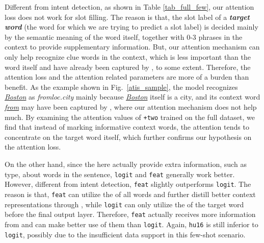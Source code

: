 Different from intent detection, as shown in Table \ref{tab_full_few}, our attention loss does not work for slot filling.
The reason is that, the slot label of a \textbf{\emph{target word}} (the word for which we are trying to predict a slot label) is decided mainly by the semantic meaning of the word itself, together with 0-3 phrases in the context to provide supplementary information.
But, our attention mechanism can only help recognize clue words in the context, which is less important than the word itself and have already been captured by \BLSTM, to some extent. %
Therefore, the attention loss and the attention related parameters are more of a burden than benefit.
As the example shown in Fig.~\ref{atis_sample},
the model recognizes \textsl{\underline{Boston}} as \emph{fromloc.city} mainly because \textsl{\underline{Boston}} itself is a city, 
and its  context word \textsl{\underline{from}} may have been %
captured by \BLSTM, where our attention mechanism does not help much.
By examining the attention values of \texttt{+two} trained on the full dataset,
we find that instead of marking informative context words, the attention tends to concentrate on the target word itself, which
further confirms our hypothesis on the attention loss.

On the other hand, since the \REtags here actually provide extra information, such as type, about words in the sentence, \texttt{logit} and \texttt{feat} generally work better.
However, different from intent detection, \texttt{feat} slightly outperforms \texttt{logit}.
The reason is that, \texttt{feat} can utilize the \REtags of all words and further distill better context representations through \NN, 
while \texttt{logit} can only utilize the \REtag of the target word before the final output layer.
Therefore, \texttt{feat} actually receives more information from \RE and can make better use of them than \texttt{logit}.
Again, \texttt{hu16} is still inferior to \texttt{logit}, %
possibly due to the insufficient data support in this few-shot scenario. 

